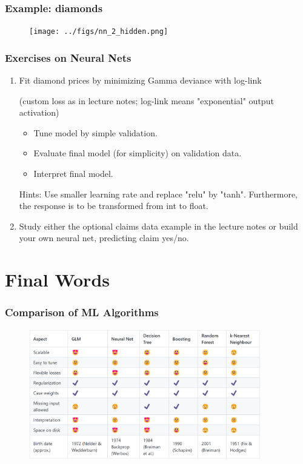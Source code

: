 \documentclass[
    utf8,
    aspectratio=169
]{beamer}  %
\begin{document}
\begin{frame}
	\frametitle{Example: diamonds}
	\begin{figure}
		\texttt{[image: ../figs/nn\_2\_hidden.png]}
	\end{figure}
\end{frame}

\begin{frame}
	\frametitle{Exercises on Neural Nets}
	\begin{enumerate}
		\item Fit diamond prices by minimizing Gamma deviance with log-link 
		
		(custom loss as in lecture notes; log-link means "exponential" output activation)
		\begin{itemize}
			\item Tune model by simple validation.
			\item Evaluate final model (for simplicity) on validation data.
			\item Interpret final model.
		\end{itemize}
		Hints: Use smaller learning rate and replace "relu" by "tanh". Furthermore, the response is to be transformed from int to float.
		
		\vfill
		
		\item Study either the optional claims data example in the lecture notes or build your own neural net, predicting claim yes/no.
	\end{enumerate}
\end{frame}

\section{Final Words}

\begin{frame}
	\frametitle{Comparison of ML Algorithms}
		\begin{figure}
		\includegraphics[width=0.9\textwidth]{pics/algorithms.png}
	\end{figure}
\end{frame}
\end{document}
